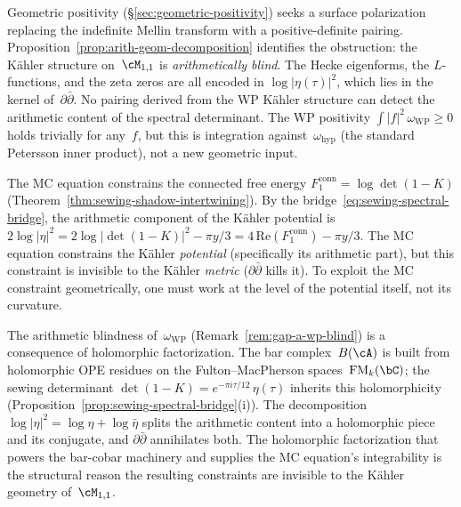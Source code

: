 \begin{remark}%
\label{rem:gap-a-wp-blind}%
%
Geometric positivity
(\S\ref{sec:geometric-positivity}) seeks a surface
polarization replacing the indefinite Mellin
transform with a positive-definite pairing.
Proposition~\ref{prop:arith-geom-decomposition}
identifies the obstruction: the
K\"ahler structure on~$\cM_{1,1}$ is \emph{arithmetically
blind}. The Hecke eigenforms, the $L$-functions, and the
zeta zeros are all encoded in
$\log\lvert\eta(\tau)\rvert^2$, which lies in the kernel
of~$\partial\bar\partial$. No pairing derived from the
WP K\"ahler structure can detect the arithmetic content of
the spectral determinant. The WP positivity
$\int\lvert f\rvert^2\,\omega_{\mathrm{WP}} \ge 0$
holds trivially for any~$f$, but this is integration
against~$\omega_{\mathrm{hyp}}$ (the standard Petersson
inner product), not a new geometric input.
\end{remark}

\begin{remark}%
\label{rem:mc-kahler-potential}%
%
The MC equation constrains the connected free energy
$F_1^{\mathrm{conn}} = \log\det(1-K)$
(Theorem~\ref{thm:sewing-shadow-intertwining}). By the
bridge~\eqref{eq:sewing-spectral-bridge}, the
arithmetic component of the K\"ahler potential is
$2\log\lvert\eta\rvert^2
= 2\log\lvert\det(1-K)\rvert^2 - \pi y/3
= 4\,\mathrm{Re}(F_1^{\mathrm{conn}}) - \pi y/3$.
The MC equation constrains the K\"ahler \emph{potential}
(specifically its arithmetic part), but this constraint
is invisible to the K\"ahler \emph{metric}
($\partial\bar\partial$ kills it). To exploit the MC
constraint geometrically, one must work at the level of the
potential itself, not its curvature.
\end{remark}

\begin{remark}%
\label{rem:holomorphic-arithmetic-blindness}%
%
The arithmetic blindness of~$\omega_{\mathrm{WP}}$
(Remark~\ref{rem:gap-a-wp-blind}) is a consequence of holomorphic
factorization. The bar complex~$B(\cA)$ is built from
holomorphic OPE residues on the Fulton--MacPherson
spaces~$\mathrm{FM}_k(\bC)$; the sewing determinant
$\det(1-K) = e^{-\pi i\tau/12}\,\eta(\tau)$ inherits
this holomorphicity
(Proposition~\ref{prop:sewing-spectral-bridge}(i)).
The decomposition
$\log\lvert\eta\rvert^2 = \log\eta + \log\bar\eta$
splits the arithmetic content into a holomorphic piece
and its conjugate, and $\partial\bar\partial$ annihilates
both. The holomorphic factorization that powers the
bar-cobar machinery and supplies the MC equation's
integrability is the structural reason the resulting
constraints are invisible to the K\"ahler geometry
of~$\cM_{1,1}$.
\end{remark}

